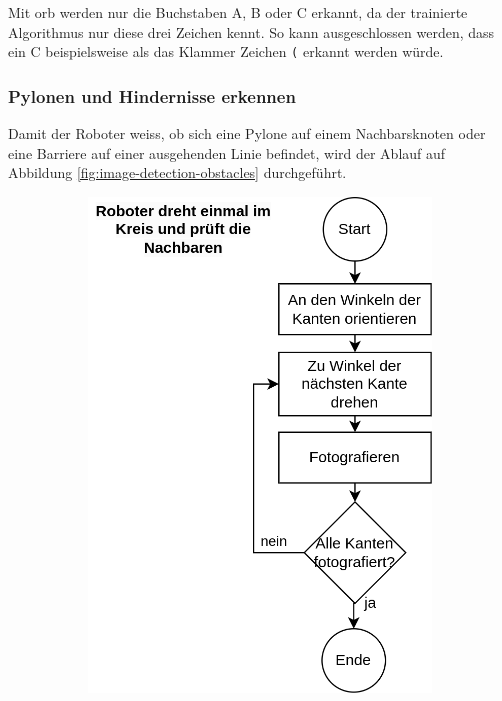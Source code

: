 Mit \acrshort{orb} werden nur die Buchstaben A, B oder C erkannt, da der trainierte Algorithmus nur diese drei Zeichen kennt. So kann ausgeschlossen werden, dass ein C beispielsweise als das Klammer Zeichen \verb|(| erkannt werden würde.


\subsubsection{Pylonen und Hindernisse erkennen}

Damit der Roboter weiss, ob sich eine Pylone auf einem Nachbarsknoten oder eine Barriere auf einer ausgehenden Linie befindet, wird der Ablauf auf Abbildung \ref{fig:image-detection-obstacles} durchgeführt.

\begin{figure}[H]
\begin{subfigure}{0.45\textwidth}
\includegraphics[width=\textwidth]{assets/gesamtkonzept/ablaufdiagramm-hindernisse-erkennen.png}

\end{subfigure}
\end{figure}
